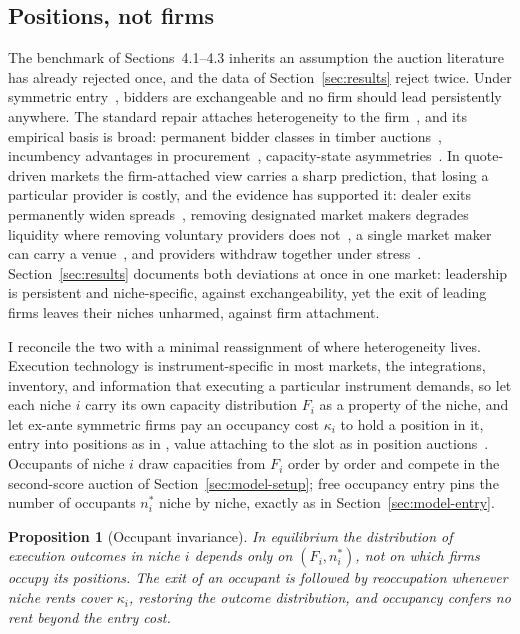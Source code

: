 \documentclass[11pt]{article}
\theoremstyle{plain}
\newtheorem{proposition}{Proposition}
\theoremstyle{definition}
\theoremstyle{remark}
\begin{document}
\subsection{Positions, not firms}\label{sec:model-positions}
The benchmark of Sections~4.1--4.3 inherits an assumption the auction literature has already rejected once, and the data of Section~\ref{sec:results} reject twice. Under symmetric entry~\citep{mcafee1987entry,levin1994entry}, bidders are exchangeable and no firm should lead persistently anywhere. The standard repair attaches heterogeneity to the firm~\citep{maskin2000asymmetric}, and its empirical basis is broad: permanent bidder classes in timber auctions~\citep{athey2011open,roberts2013auctions}, incumbency advantages in procurement~\citep{desilva2003entrant}, capacity-state asymmetries~\citep{jofre2003dynamic}. In quote-driven markets the firm-attached view carries a sharp prediction, that losing a particular provider is costly, and the evidence has supported it: dealer exits permanently widen spreads~\citep{wahal1997entry}, removing designated market makers degrades liquidity where removing voluntary providers does not~\citep{clarkjoseph2017designated,venkataraman2007value}, a single market maker can carry a venue~\citep{menkveld2013high}, and providers withdraw together under stress~\citep{anand2016market}. Section~\ref{sec:results} documents both deviations at once in one market: leadership is persistent and niche-specific, against exchangeability, yet the exit of leading firms leaves their niches unharmed, against firm attachment.

I reconcile the two with a minimal reassignment of where heterogeneity lives. Execution technology is instrument-specific in most markets, the integrations, inventory, and information that executing a particular instrument demands, so let each niche $i$ carry its own capacity distribution $F_i$ as a property of the niche, and let ex-ante symmetric firms pay an occupancy cost $\kappa_i$ to hold a position in it, entry into positions as in \citet{salop1979monopolistic}, value attaching to the slot as in position auctions~\citep{edelman2007internet}. Occupants of niche $i$ draw capacities from $F_i$ order by order and compete in the second-score auction of Section~\ref{sec:model-setup}; free occupancy entry pins the number of occupants $n^\ast_i$ niche by niche, exactly as in Section~\ref{sec:model-entry}.

\begin{proposition}[Occupant invariance]\label{prop:occupancy}
In equilibrium the distribution of execution outcomes in niche $i$ depends only on $(F_i, n^\ast_i)$, not on which firms occupy its positions. The exit of an occupant is followed by reoccupation whenever niche rents cover $\kappa_i$, restoring the outcome distribution, and occupancy confers no rent beyond the entry cost.
\end{proposition}
\end{document}
